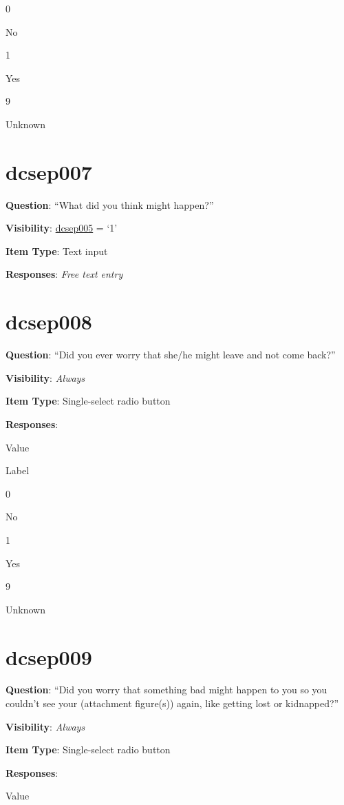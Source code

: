 \documentclass[]{book}
\begin{document}
0

No

1

Yes

9

Unknown

\hypertarget{dcsep007}{%
\section{dcsep007}\label{dcsep007}}

\textbf{Question}: ``What did you think might happen?''

\textbf{Visibility}: \protect\hyperlink{dcsep005}{dcsep005} = `1'

\textbf{Item Type}: Text input

\textbf{Responses}: \emph{Free text entry}

\hypertarget{dcsep008}{%
\section{dcsep008}\label{dcsep008}}

\textbf{Question}: ``Did you ever worry that she/he might leave and not come back?''

\textbf{Visibility}: \emph{Always}

\textbf{Item Type}: Single-select radio button

\textbf{Responses}:

Value

Label

0

No

1

Yes

9

Unknown

\hypertarget{dcsep009}{%
\section{dcsep009}\label{dcsep009}}

\textbf{Question}: ``Did you worry that something bad might happen to you so you couldn't see your (attachment figure(s)) again, like getting lost or kidnapped?''

\textbf{Visibility}: \emph{Always}

\textbf{Item Type}: Single-select radio button

\textbf{Responses}:

Value
\end{document}

